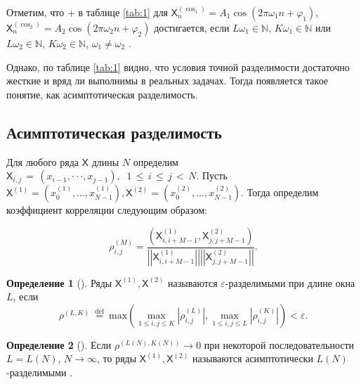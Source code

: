\documentclass[12pt, specialist, subf
]{disser}
\theoremstyle{definition}
\newcommand{\TS}{\mathsf{X}}
\newtheorem{definition}{Определение} %
\begin{document}
Отметим, что $+$ в таблице \ref{tab:1} для $\TS^{(\cos_1)}_{n} = A_1 \cos\left(2 \pi{\omega_1} n + \varphi_1\right)$,
$\TS^{(\cos_2)}_{n} = A_2 \cos\left(2 \pi{\omega_2} n + \varphi_2\right)$ достигается, если $L\omega_1 \in \mathbb{N}, \, K\omega_1 \in \mathbb{N}$ или $L\omega_2 \in \mathbb{N}, \, K\omega_2 \in \mathbb{N}$, $\omega_1 \not = \omega_2$ \cite{golyandina2001analysis}.

Однако, по таблице \ref{tab:1} видно, что условия точной разделимости достаточно жесткие и вряд ли выполнимы в реальных задачах. Тогда появляется такое понятие, как асимптотическая разделимость.

\subsection{Асимптотическая разделимость}

Для любого ряда $\TS$ длины $N$ определим
$\TS_{i,j}\,=\,(x_{i-1},\cdot\cdot\cdot,x_{j-1}),\;\;1\,\leq\,i\,\leq\,j\,<\,N.$
Пусть $\TS^{(1)}=(x_{0}^{(1)}, \ldots, x_{N-1}^{(1)}), \TS^{(2)}=(x_{0}^{(2)}, \ldots,x_{N-1}^{(2)}).$ Тогда определим коэффициент корреляции следующим образом:


\begin{equation*}
	\rho_{i,j}^{(M)}=\frac{\left(\TS_{i,i+M-1}^{(1)},\TS_{j,j+M-1}^{(2)}\right)}{\left|\left|\TS_{i,i+M-1}^{(1)}\right|\right|\left|\left|\TS_{j,j+M-1}^{(2)}\right|\right|}.
\end{equation*}

\begin{definition}[\cite{golyandina2001analysis}]
	Ряды $\TS^{(1)}, \TS^{(2)}$ называются $\varepsilon$-разделимыми при длине окна $L$, если
	\begin{equation*}
		\rho^{(L,K)}\ {\stackrel{\mathrm{def}}{=}}\ \mathrm{max}\left(\operatorname*{max}_{1\leq i,j\leq K}|\rho_{i,j}^{(L)}|,\operatorname*{max}_{1\leq i,j\leq L}|\rho_{i,j}^{(K)}|\right)<\varepsilon
		\text{.}
	\end{equation*}

\end{definition}

\begin{definition}[\cite{golyandina2001analysis}]
	Если $\rho^{(L(N),K(N))} \rightarrow 0$ при некоторой последовательности $L = L(N) $, $N \rightarrow \infty$, то ряды $\TS^{(1)}, \TS^{(2)}$ называются асимптотически $L(N)$-разделимыми .
\end{definition}
\end{document}
